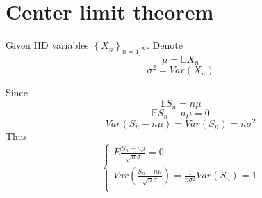 \section{Center limit theorem}
Given IID variables $\left\{ X_n \right\}_{n=1]^\infty}$. Denote
$$\mu = \mathbb{E} X_n$$
$$\sigma^2 = Var(X_n)$$

Since 
$$\mathbb{E} S_n = n\mu$$
$$\mathbb{E} S_n - n\mu = 0$$
$$Var( S_n - n\mu ) = Var(S_n) = n\sigma^2$$
Thus
$$\begin{cases}
E \frac{S_n - n\mu}{\sqrt{n} \sigma} = 0\\
Var\left( \frac{S_n - n\mu}{\sqrt{n} \sigma}\right) = \frac{1}{n\sigma^2} Var(S_n) = 1\\
\end{cases}$$